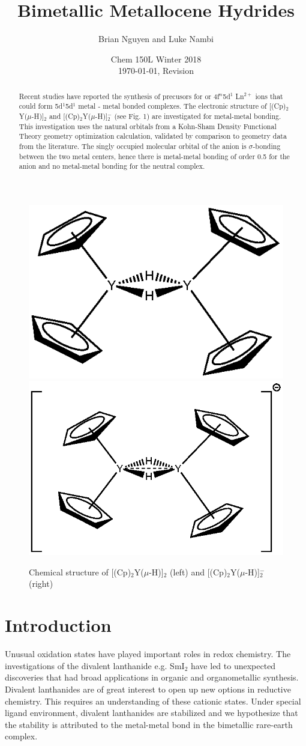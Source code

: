 \documentclass[11pt]{article}
\title{\textbf{Bimetallic Metallocene Hydrides}}
\author{Brian Nguyen and Luke Nambi}
\date{Chem 150L Winter 2018 \\ \today, Revision \Revision}
\begin{document}
\maketitle

\begin{abstract}

  \noindent Recent studies have reported the synthesis of precusors
  for or 4f$^n$5d$^1$ Ln$^{2+}$ ions that could form 5d$^1$5d$^1$
  metal - metal bonded complexes. The electronic structure of [(Cp)$_2$Y($\mu$-H)]$_2$
  and [(Cp)$_2$Y($\mu$-H)]$^-_2$ (see Fig. 1) are investigated for metal-metal bonding.
  This investigation uses the natural orbitals from a Kohn-Sham
  Density Functional Theory geometry optimization calculation, 
  validated by comparison to geometry data from the literature. 
  The singly occupied molecular orbital of the anion is $\sigma$-bonding
  between the two metal centers, hence there is metal-metal
  bonding of order 0.5 for the anion and no metal-metal bonding
  for the neutral complex.
\end{abstract}


\begin{figure}[htbp]
  \centering
  \label{fig:YYchemStruct}

  \includegraphics[width=.40\textwidth]{neutral.eps}
  \includegraphics[width=.49\textwidth]{anion.eps}

  \caption{Chemical structure of [(Cp)$_2$Y($\mu$-H)]$_2$ (left)
  and [(Cp)$_2$Y($\mu$-H)]$^-_2$ (right)}
\end{figure}

\section{Introduction}
Unusual oxidation states have played important roles in redox chemistry.
The investigations of the divalent lanthanide e.g. SmI$_2$ have led to
unexpected discoveries that had broad applications in organic and
organometallic synthesis. Divalent lanthanides are of great interest
to open up new options in reductive chemistry. This requires an understanding
of these cationic states. Under special ligand environment, divalent lanthanides
are stabilized and we hypothesize that the stability is attributed to the
metal-metal bond in the bimetallic rare-earth complex.
\end{document}
